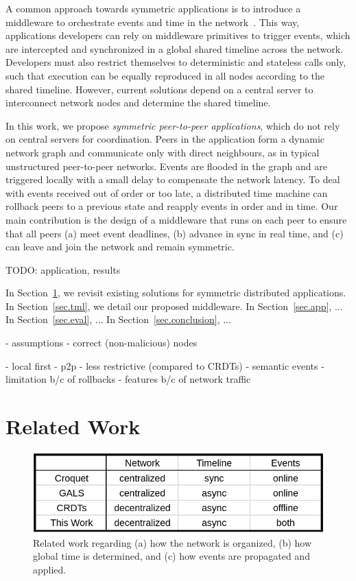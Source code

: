 \documentclass[10pt,journal,compsoc]{IEEEtran}
\begin{document}
A common approach towards symmetric applications is to introduce a middleware
to orchestrate events and time in the network~\cite{gals,croquet}.
This way, applications developers can rely on middleware primitives to trigger
events, which are intercepted and synchronized in a global shared timeline
across the network.
Developers must also restrict themselves to deterministic and stateless calls
only, such that execution can be equally reproduced in all nodes according to
the shared timeline.
However, current solutions depend on a central server to interconnect network
nodes and determine the shared timeline.

In this work, we propose \emph{symmetric peer-to-peer applications}, which
do not rely on central servers for coordination.
Peers in the application form a dynamic network graph and communicate only
with direct neighbours, as in typical unstructured peer-to-peer networks.
Events are flooded in the graph and are triggered locally with a small delay
to compensate the network latency.
To deal with events received out of order or too late, a distributed time
machine can rollback peers to a previous state and reapply events in order and
in time.
Our main contribution is the design of a middleware that runs on each peer to
ensure that all peers
    (a) meet event deadlines,
    (b) advance in sync in real time, and
    (c) can leave and join the network and remain symmetric.

TODO: application, results

In Section~\ref{sec.related}, we revisit existing solutions for symmetric
distributed applications.
In Section~\ref{sec.tml}, we detail our proposed middleware.
In Section~\ref{sec.app}, ...
In Section~\ref{sec.eval}, ...
In Section~\ref{sec.conclusion}, ...

- assumptions
    - correct (non-malicious) nodes

- local first
- p2p
- less restrictive (compared to CRDTs)
- semantic events
    - limitation b/c of rollbacks
    - features b/c of network traffic

\section{Related Work}
\label{sec.related}

\begin{figure}[t]
  \centering
  \includegraphics[width=\linewidth]{table}
  \caption{
    Related work regarding
        (a) how the network is organized,
        (b) how global time is determined, and
        (c) how events are propagated and applied.
    \label{fig.table}
  }
\end{figure}
\end{document}
